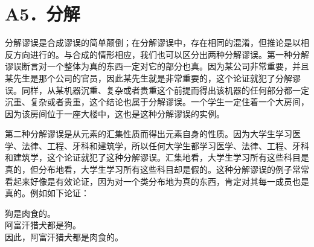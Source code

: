 \section*{A5．分解}
分解谬误是合成谬误的简单颠倒；在分解谬误中，存在相同的混淆，但推论是以相反方向进行的。与合成的情形相应，我们也可以区分出两种分解谬误。第一种分解谬误断言对一个整体为真的东西一定对它的部分也真。因为某公司非常重要，并且某先生是那个公司的官员，因此某先生就是非常重要的，这个论证就犯了分解谬误。同样，从某机器沉重、复杂或者贵重这个前提而得出该机器的任何部分都一定沉重、复杂或者贵重，这个结论也属于分解谬误。一个学生一定住着一个大房间，因为该房间位于一座大楼中，这也是这种分解谬误的实例。

第二种分解谬误是从元素的汇集性质而得出元素自身的性质。因为大学生学习医学、法律、工程、牙科和建筑学，所以任何大学生都学习医学、法律、工程、牙科和建筑学，这个论证就犯了这种分解谬误。汇集地看，大学生学习所有这些科目是真的，但分布地看，大学生学习所有这些科目却是假的。这种分解谬误的例子常常看起来好像是有效论证，因为对一个类分布地为真的东西，肯定对其每一成员也是真的。例如如下论证：

狗是肉食的。\\
阿富汗猎犬都是狗。\\
因此，阿富汗猎犬都是肉食的。 